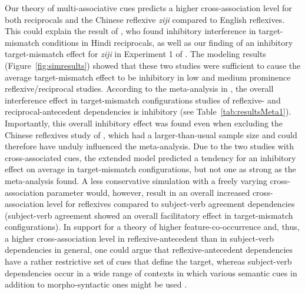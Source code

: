 \documentclass{cambridge7A}\usepackage[]{graphicx}\usepackage[]{color}
\newcommand{\revised}[1]{#1}
\begin{document}
Our theory of multi-associative cues predicts a higher cross-association level for both reciprocals and the Chinese reflexive \textit{ziji} compared to English reflexives. This could explain the result of \cite{KushPhillips2014}, who found inhibitory interference in target-mismatch conditions in Hindi reciprocals, as well as our finding of an inhibitory target-mismatch effect for \textit{ziji} in Experiment 1 of \cite{JaegerEngelmannVasishth2015}.
The modeling results (Figure~\ref{fig:simresults}) showed that these two studies were sufficient to cause the average target-mismatch effect to be inhibitory in low and medium prominence reflexive/reciprocal studies. 
According to the meta-analysis in \cite{JaegerEngelmannVasishth2017}, the overall interference effect in target-mismatch configurations studies of reflexive- and reciprocal-antecedent dependencies is inhibitory  (see Table~\ref{tab:resultsMeta1}). Importantly, this overall inhibitory effect was found even when excluding the Chinese reflexives study of \cite{JaegerEngelmannVasishth2015}, which had a larger-than-usual sample size and could therefore have unduly influenced the meta-analysis.
Due to the two studies with cross-associated cues, the extended model predicted a tendency for an inhibitory effect on average in target-mismatch configurations, but not \revised{one as strong} as the meta-analysis found. 
A less conservative simulation with a freely varying cross-association parameter would, however, result in an overall increased cross-association level for reflexives compared to subject-verb agreement dependencies (subject-verb agreement showed an overall facilitatory effect in target-mismatch configurations).
In support for a theory of higher feature-co-occurrence and, thus, a higher cross-association level in reflexive-antecedent than in subject-verb dependencies in general, one could argue that reflexive-antecedent dependencies have a rather restrictive set of cues that define the target, whereas subject-verb dependencies occur in a wide range of contexts in which various semantic cues in addition to morpho-syntactic ones might be used \citep[cf.][]{VanDyke2006}.
\end{document}
